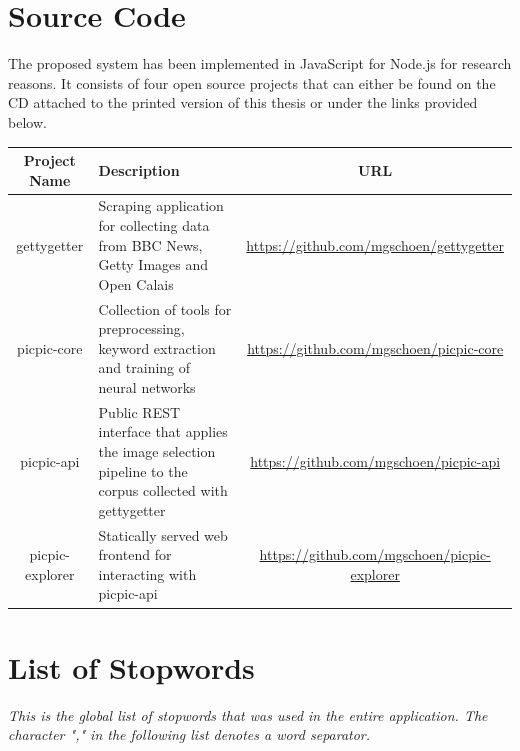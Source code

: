 \documentclass[11pt,a4paper,twoside]{article}
\begin{document}

\cleardoublepage

\begin{appendix}

\section{Source Code} \label{AppendixCode}

The proposed system has been implemented in JavaScript for Node.js for research reasons. It consists of four open source projects that can either be found on the CD attached to the printed version of this thesis or under the links provided below.

\begin{table}[h]
    \centering
    \begin{tabular}{|c|p{4.5cm}|c|}
        \hline
        \textbf{Project Name} & \textbf{Description} & \textbf{URL} \\
        \hline
        gettygetter & Scraping application for collecting data from BBC News, Getty Images and Open Calais & \url{https://github.com/mgschoen/gettygetter} \\
        \hline
        picpic-core & Collection of tools for preprocessing, keyword extraction and training of neural networks & \url{https://github.com/mgschoen/picpic-core} \\
        \hline
        picpic-api & Public REST interface that applies the image selection pipeline to the corpus collected with gettygetter & \url{https://github.com/mgschoen/picpic-api} \\
        \hline
        picpic-explorer & Statically served web frontend for interacting with picpic-api & \url{https://github.com/mgschoen/picpic-explorer} \\
        \hline
    \end{tabular}
    \label{table:source-code}
\end{table}

\clearpage

\section{List of Stopwords} \label{AppendixStopwords}

\emph{This is the global list of stopwords that was used in the entire application. The character "," in the following list denotes a word separator.}


\end{appendix}
\end{document}
